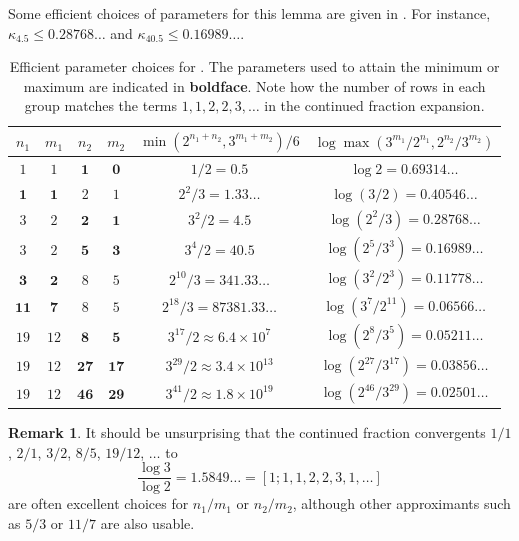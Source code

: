 \documentclass[12pt,a4paper,reqno]{amsart}
\numberwithin{equation}{section}
\theoremstyle{plain}
\theoremstyle{definition}
\newtheorem{remark}[theorem]{Remark}
\begin{document}
Some efficient choices of parameters for this lemma are given in .  For instance, $\kappa_{4.5} \leq 0.28768\dots$ and $\kappa_{40.5} \leq 0.16989\dots$.

\begin{table}[h]
\centering
\begin{tabular}{|c|c|c|c|c|c|}
\hline
$n_1$ & $m_1$ & $n_2$ & $m_2$ & $\min(2^{n_1+n_2},3^{m_1+m_2})/6$ & $\log \max(3^{m_1}/2^{n_1}, 2^{n_2}/3^{m_2})$ \\
\hline
$1$ & $1$ & $\mathbf{1}$ & $\mathbf{0}$ & $1/2 = 0.5$ & $\log 2 = 0.69314\dots$ \\
\hline
$\mathbf{1}$ & $\mathbf{1}$ & $2$ & $1$ & $2^2/3 = 1.33\dots$ & $\log (3/2) = 0.40546\dots$\\
\hline
$3$ & $2$ & $\mathbf{2}$ & $\mathbf{1}$ & $3^2/2 = 4.5$ & $\log (2^2/3) = 0.28768\dots$ \\
$3$ & $2$ & $\mathbf{5}$ & $\mathbf{3}$ & $3^4/2 = 40.5$ & $\log (2^5/3^3) = 0.16989\dots$ \\
\hline
$\mathbf{3}$ & $\mathbf{2}$ & $8$ & $5$ & $2^{10}/3 = 341.33\dots$ & $\log (3^2/2^3) = 0.11778\dots$\\ 
$\mathbf{11}$ & $\mathbf{7}$ & $8$ & $5$ & $2^{18}/3 = 87381.33\dots$ & $\log (3^7/2^{11}) = 0.06566\dots$ \\
\hline
$19$ & $12$ & $\mathbf{8}$ & $\mathbf{5}$ & $3^{17}/2 \approx 6.4 \times 10^7$ & $\log (2^8/3^5) = 0.05211\dots$ \\
$19$ & $12$ & $\mathbf{27}$ & $\mathbf{17}$ & $3^{29}/2 \approx 3.4 \times 10^{13}$ & $\log (2^{27}/3^{17}) = 0.03856\dots$ \\
$19$ & $12$ & $\mathbf{46}$ & $\mathbf{29}$ & $3^{41}/2 \approx 1.8 \times 10^{19} $ & $\log (2^{46}/3^{29}) = 0.02501\dots$ \\
\hline
\end{tabular}
\caption{Efficient parameter choices for .  The parameters used to attain the minimum or maximum are indicated in \textbf{boldface}. Note how the number of rows in each group matches the terms $1,1,2,2,3,\dots$ in the continued fraction expansion.}\label{approx-table}
\end{table}

\begin{remark}
It should be unsurprising that the continued fraction convergents $1/1$, $2/1$, $3/2$, $8/5$, $19/12$, $\dots$ to 
$$\frac{\log 3}{\log 2} = 1.5849\dots = [1; 1,1,2,2,3,1,\dots]$$
are often excellent choices for $n_1/m_1$ or $n_2/m_2$, although other approximants such as $5/3$ or $11/7$ are also usable.
\end{remark}
\end{document}
